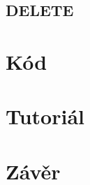 \documentclass[oneside,11pt]{fithesis2}
\begin{document}
\section{DELETE}

\chapter{Kód}
\chapter{Tutoriál}
\chapter{Závěr}
\end{document}
